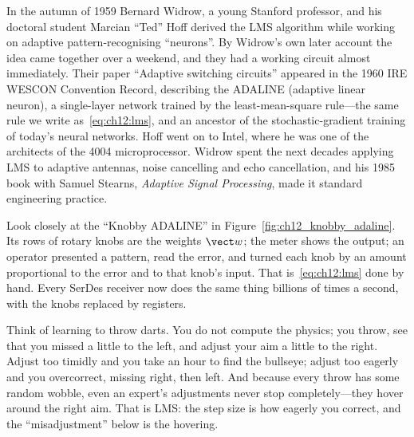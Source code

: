 \begin{history}
In the autumn of 1959 Bernard Widrow, a young Stanford professor, and his doctoral student
Marcian ``Ted'' Hoff derived the LMS algorithm while working on adaptive pattern-recognising
``neurons''. By Widrow's own later account the idea came together over a weekend, and they had a
working circuit almost immediately. Their paper ``Adaptive switching circuits'' appeared in the
1960 IRE WESCON Convention Record, describing the ADALINE (adaptive linear neuron), a single-layer
network trained by the least-mean-square rule---the same rule we write as~\eqref{eq:ch12:lms}, and an
ancestor of the stochastic-gradient training of today's neural networks. Hoff went on to Intel,
where he was one of the architects of the 4004 microprocessor. Widrow spent the next decades
applying LMS to adaptive antennas, noise cancelling and echo cancellation, and his 1985 book with
Samuel Stearns, \emph{Adaptive Signal Processing}, made it standard engineering practice.
\end{history}

Look closely at the ``Knobby ADALINE'' in Figure~\ref{fig:ch12_knobby_adaline}. Its rows of
rotary knobs are the weights $\vect w$; the meter shows the output; an operator presented a pattern,
read the error, and turned each knob by an amount proportional to the error and to that knob's
input. That is~\eqref{eq:ch12:lms} done by hand. Every SerDes receiver now does the same thing
billions of times a second, with the knobs replaced by registers.

\begin{analogy}
Think of learning to throw darts. You do not compute the physics; you throw, see that you missed a
little to the left, and adjust your aim a little to the right. Adjust too timidly and you take an
hour to find the bullseye; adjust too eagerly and you overcorrect, missing right, then left. And
because every throw has some random wobble, even an expert's adjustments never stop completely---they
hover around the right aim. That is LMS: the step size is how eagerly you correct, and the
``misadjustment'' below is the hovering.
\end{analogy}


